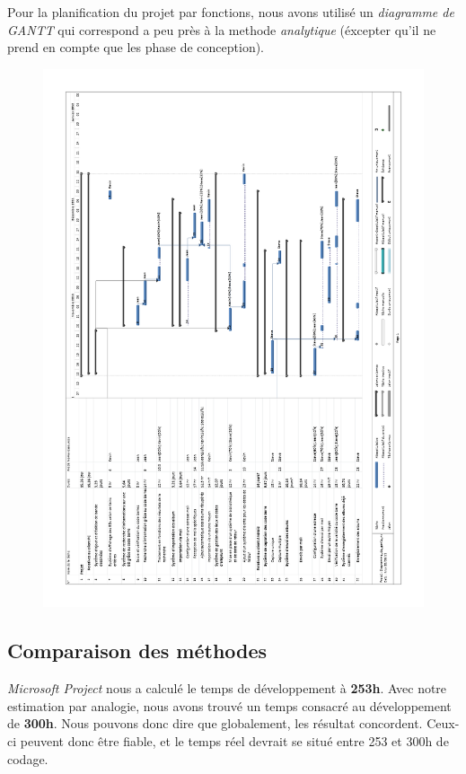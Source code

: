 Pour la planification du projet par fonctions, nous avons utilisé un \emph{diagramme de GANTT} qui correspond a peu près à la methode \emph{analytique} (éxcepter qu'il ne prend en compte que les phase de conception).
\begin{figure}
\includegraphics[width=15cm]{../Diagramme_gante.png}
\end{figure}
\clearpage

\subsection{Comparaison des méthodes}
\emph{Microsoft Project} nous a calculé le temps de développement à \textbf{253h}. 
Avec notre estimation par analogie, nous avons trouvé un temps consacré au développement de \textbf{300h}. 
Nous pouvons donc dire que globalement, les résultat concordent. 
Ceux-ci peuvent donc être fiable, et le temps réel devrait se situé entre 253 et 300h de codage. 

